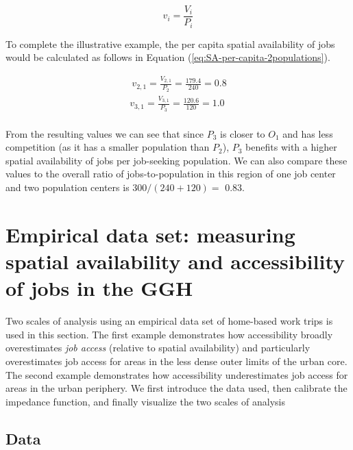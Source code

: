 \documentclass[]{elsarticle} %
\begin{document}
\begin{equation}
\label{eq:SA-per-capita}
v_i = \frac{V_i}{P_i}
\end{equation}

To complete the illustrative example, the per capita spatial
availability of jobs would be calculated as follows in Equation
(\ref{eq:SA-per-capita-2populations}).

\begin{equation}
\label{eq:SA-per-capita-2populations}
\begin{array}{l}\
v_{2,1} = \frac{V_{2,1}}{P_2} =  \frac{179.4}{240} = 0.8\\
v_{3,1} =  \frac{V_{3,1}}{P_3} =  \frac{120.6}{120} = 1.0\\
\end{array}
\end{equation}

From the resulting values we can see that since \(P_3\) is closer to
\(O_1\) and has less competition (as it has a smaller population than
\(P_2\)), \(P_3\) benefits with a higher spatial availability of jobs
per job-seeking population. We can also compare these values to the
overall ratio of jobs-to-population in this region of one job center and
two population centers is \(300/(240 + 120)=\) 0.83.

\hypertarget{empirical-data-set-measuring-spatial-availability-and-accessibility-of-jobs-in-the-ggh}{%
\section{Empirical data set: measuring spatial availability and
accessibility of jobs in the
GGH}\label{empirical-data-set-measuring-spatial-availability-and-accessibility-of-jobs-in-the-ggh}}

Two scales of analysis using an empirical data set of home-based work
trips is used in this section. The first example demonstrates how
accessibility broadly overestimates \emph{job access} (relative to
spatial availability) and particularly overestimates job access for
areas in the less dense outer limits of the urban core. The second
example demonstrates how accessibility underestimates job access for
areas in the urban periphery. We first introduce the data used, then
calibrate the impedance function, and finally visualize the two scales
of analysis

\hypertarget{data}{%
\subsection{Data}\label{data}}
\end{document}
